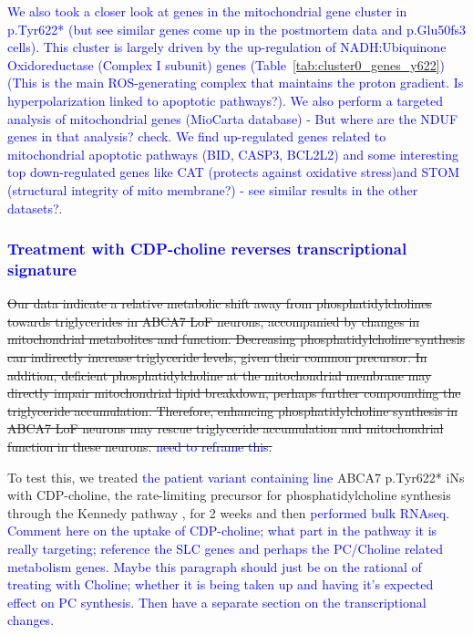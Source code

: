 \textcolor{blue}{We also took a closer look at genes in the mitochondrial gene cluster in p.Tyr622* (but see similar genes come up in the postmortem data and p.Glu50fs3 cells). This cluster is largely driven by the up-regulation of NADH:Ubiquinone Oxidoreductase (Complex I subunit) genes (Table~\ref{tab:cluster0_genes_y622}) (This is the main ROS-generating complex that maintains the proton gradient. Is hyperpolarization linked to apoptotic pathways?). We also perform a targeted analysis of mitochondrial genes (MioCarta database) - But where are the NDUF genes in that analysis? check. We find up-regulated genes related to mitochondrial apoptotic pathways (BID, CASP3, BCL2L2) and some interesting top down-regulated genes like CAT (protects against oxidative stress)and STOM (structural integrity of mito membrane?) - see similar results in the other datasets?}.

\subsubsection{\textcolor{blue}{Treatment with CDP-choline reverses transcriptional signature}}
\sout{Our data indicate a relative metabolic shift away from phosphatidylcholines towards triglycerides in ABCA7 LoF neurons, accompanied by changes in mitochondrial metabolites and function. Decreasing phosphatidylcholine synthesis can indirectly increase triglyceride levels, given their common precursor\cite{Farese2023-bb}.  In addition, deficient phosphatidylcholine at the mitochondrial membrane may directly impair mitochondrial lipid breakdown, perhaps further compounding the triglyceride accumulation\cite{Schuler2016-tr,Szymkowicz2019-be,Mejia2015-tw,Prola2021-uz}. Therefore, enhancing phosphatidylcholine synthesis in ABCA7 LoF neurons may rescue triglyceride accumulation and mitochondrial function in these neurons. \textcolor{blue}{need to reframe this}.}

To test this, we treated \textcolor{blue}{the patient variant containing line} ABCA7 p.Tyr622* iNs with CDP-choline, the rate-limiting precursor for phosphatidylcholine synthesis through the Kennedy pathway \cite{Zeisel2009-xv,Son2024-tu}, for 2 weeks and then \textcolor{blue}{performed bulk RNAseq}. \textcolor{blue}{Comment here on the uptake of CDP-choline; what part in the pathway it is really targeting; reference the SLC genes and perhaps the PC/Choline related metabolism genes. Maybe this paragraph should just be on the rational of treating with Choline; whether it is being taken up and having it's expected effect on PC synthesis. Then have a separate section on the transcriptional changes}.

